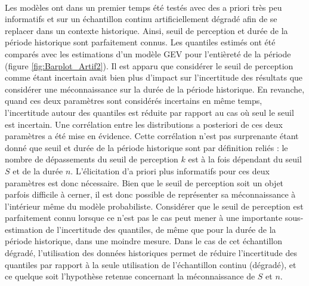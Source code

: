 \documentclass[11pt]{article}
\begin{document}
	\paragraph{} Les modèles ont dans un premier temps été testés avec des a priori très peu informatifs et sur un échantillon continu artificiellement dégradé afin de se replacer dans un contexte historique. Ainsi, seuil de perception et durée de la période historique sont parfaitement connus. Les quantiles estimés ont été comparés avec les estimations d'un modèle GEV pour l'entièreté de la période (figure \ref{fig:Barplot_Artif2}). Il est apparu que considérer le seuil de perception comme étant incertain avait bien plus d'impact sur l'incertitude des résultats que considérer une méconnaissance sur la durée de la période historique. En revanche, quand ces deux paramètres sont considérés incertains en même temps, l'incertitude autour des quantiles est réduite par rapport au cas où seul le seuil est incertain. Une corrélation entre les distributions a posteriori de ces deux paramètres a été mise en évidence. Cette corrélation n'est pas surprenante étant donné que seuil et durée de la période historique sont par définition reliés : le nombre de dépassements du seuil de perception $k$ est à la fois dépendant du seuil $S$ et de la durée $n$. L'élicitation d'a priori plus informatifs pour ces deux paramètres est donc nécessaire. Bien que le seuil de perception soit un objet parfois difficile à cerner, il est donc possible de représenter sa méconnaissance à l'intérieur même du modèle probabiliste. Considérer que le seuil de perception est parfaitement connu lorsque ce n'est pas le cas peut mener à une importante sous-estimation de l'incertitude des quantiles, de même que pour la durée de la période historique, dans une moindre mesure. Dans le cas de cet échantillon dégradé, l'utilisation des données historiques permet de réduire l'incertitude des quantiles par rapport à la seule utilisation de l'échantillon continu (dégradé), et ce quelque soit l'hypothèse retenue concernant la méconnaissance de $S$ et $n$.
	
\end{document}
